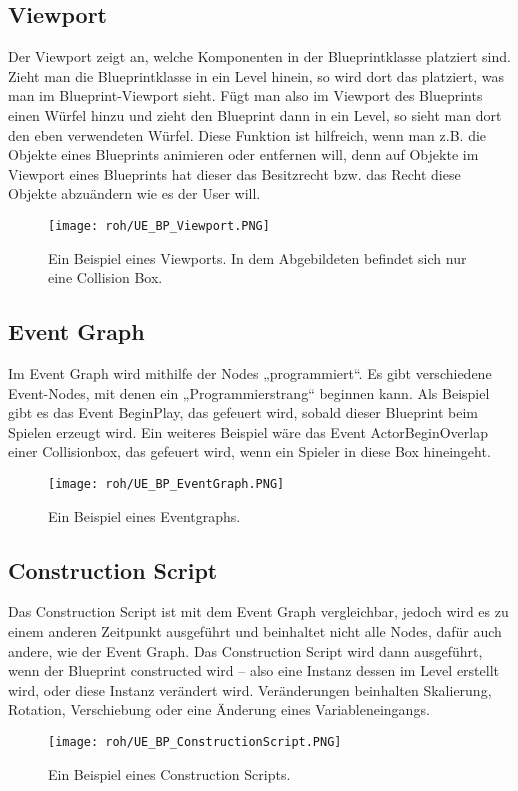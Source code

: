 \subsection{Viewport} \citep{ue:BPViewport}
Der Viewport zeigt an, welche Komponenten in der Blueprintklasse platziert sind.
Zieht man die Blueprintklasse in ein Level hinein, so wird dort das platziert, was man im Blueprint-Viewport sieht.
Fügt man also im Viewport des Blueprints einen Würfel hinzu und zieht den Blueprint dann in ein Level, so sieht man dort den eben verwendeten Würfel.
Diese Funktion ist hilfreich, wenn man z.B. die Objekte eines Blueprints animieren oder entfernen will, denn auf Objekte im Viewport eines Blueprints hat dieser das Besitzrecht bzw. das Recht diese Objekte abzuändern wie es der User will.
\begin{figure}[H]
    \centering
    \texttt{[image: roh/UE\_BP\_Viewport.PNG]}
    \caption{Ein Beispiel eines Viewports. In dem Abgebildeten befindet sich nur eine Collision Box.}
    \label{UE:BP_Viewport}
\end{figure}
\subsection{Event Graph} \citep{ue:BPEventGraph}
Im Event Graph wird mithilfe der Nodes „programmiert“.
Es gibt verschiedene Event-Nodes, mit denen ein „Programmierstrang“ beginnen kann.
Als Beispiel gibt es das Event BeginPlay, das gefeuert wird, sobald dieser Blueprint beim Spielen erzeugt wird.
Ein weiteres Beispiel wäre das Event ActorBeginOverlap einer Collisionbox, das gefeuert wird, wenn ein Spieler in diese Box hineingeht.
\begin{figure}[H]
    \centering
    \texttt{[image: roh/UE\_BP\_EventGraph.PNG]}
    \caption{Ein Beispiel eines Eventgraphs.}
    \label{UE:BP_EventGraph}
\end{figure}
\subsection{Construction Script} \citep{ue:BPConScript}
Das Construction Script ist mit dem Event Graph vergleichbar, jedoch wird es zu einem anderen Zeitpunkt ausgeführt und beinhaltet nicht alle Nodes, dafür auch andere, wie der Event Graph.
Das Construction Script wird dann ausgeführt, wenn der Blueprint constructed wird – also eine Instanz dessen im Level erstellt wird, oder diese Instanz verändert wird.
Veränderungen beinhalten Skalierung, Rotation, Verschiebung oder eine Änderung eines Variableneingangs.
\begin{figure}[H]
    \centering
    \texttt{[image: roh/UE\_BP\_ConstructionScript.PNG]}
    \caption{Ein Beispiel eines Construction Scripts.}
    \label{UE:BP_ConstructionScript}
\end{figure}
